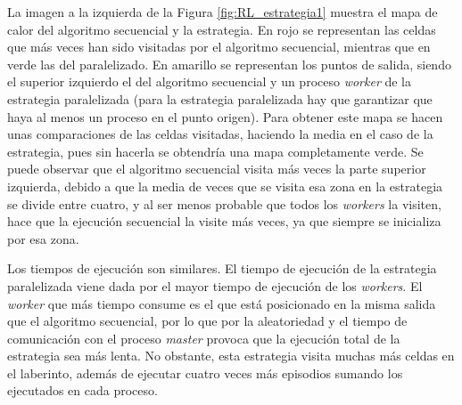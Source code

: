 La imagen a la izquierda de la Figura \ref{fig:RL_estrategia1} muestra el mapa de calor del algoritmo secuencial y la estrategia. En rojo se representan las celdas que más veces han sido visitadas por el algoritmo secuencial, mientras que en verde las del paralelizado. En amarillo se representan los puntos de salida, siendo el superior izquierdo el del algoritmo secuencial y un proceso \textit{worker} de la estrategia paralelizada (para la estrategia paralelizada hay que garantizar que haya al menos un proceso en el punto origen). Para obtener este mapa se hacen unas comparaciones de las celdas visitadas, haciendo la media en el caso de la estrategia, pues sin hacerla se obtendría una mapa completamente verde. Se puede observar que el algoritmo secuencial visita más veces la parte superior izquierda, debido a que la media de veces que se visita esa zona en la estrategia se divide entre cuatro, y al ser menos probable que todos los \textit{workers} la visiten, hace que la ejecución secuencial la visite más veces, ya que siempre se inicializa por esa zona. 

Los tiempos de ejecución son similares. El tiempo de ejecución de la estrategia paralelizada viene dada por el mayor tiempo de ejecución de los \textit{workers}. El \textit{worker} que más tiempo consume es el que está posicionado en la misma salida que el algoritmo secuencial, por lo que por la aleatoriedad y el tiempo de comunicación con el proceso \textit{master} provoca que la ejecución total de la estrategia sea más lenta. No obstante, esta estrategia visita muchas más celdas en el laberinto, además de ejecutar cuatro veces más episodios sumando los ejecutados en cada proceso.		

